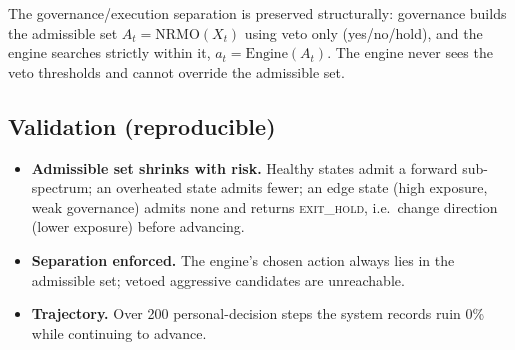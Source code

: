 The governance/execution separation is preserved structurally: governance builds
the admissible set $A_t = \mathrm{NRMO}(X_t)$ using veto only (yes/no/hold), and
the engine searches strictly within it, $a_t = \mathrm{Engine}(A_t)$. The engine
never sees the veto thresholds and cannot override the admissible set.

\subsection{Validation (reproducible)}
\begin{itemize}
  \item \textbf{Admissible set shrinks with risk.} Healthy states admit a
        forward sub-spectrum; an overheated state admits fewer; an edge state
        (high exposure, weak governance) admits none and returns \textsc{exit\_hold},
        i.e.\ change direction (lower exposure) before advancing.
  \item \textbf{Separation enforced.} The engine's chosen action always lies in
        the admissible set; vetoed aggressive candidates are unreachable.
  \item \textbf{Trajectory.} Over 200 personal-decision steps the system records
        ruin 0\% while continuing to advance.
\end{itemize}

